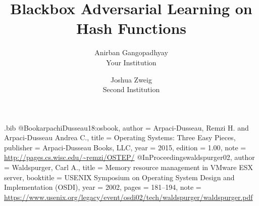 \usepackage{filecontents}
\newtheorem{theorem}{Theorem}

\begin{filecontents}{\jobname.bib}
@Book{arpachiDusseau18:osbook,
  author =       {Arpaci-Dusseau, Remzi H. and Arpaci-Dusseau Andrea C.},
  title =        {Operating Systems: Three Easy Pieces},
  publisher =    {Arpaci-Dusseau Books, LLC},
  year =         2015,
  edition =      {1.00},
  note =         {\url{http://pages.cs.wisc.edu/~remzi/OSTEP/}}
}
@InProceedings{waldspurger02,
  author =       {Waldspurger, Carl A.},
  title =        {Memory resource management in {VMware ESX} server},
  booktitle =    {USENIX Symposium on Operating System Design and
                  Implementation (OSDI)},
  year =         2002,
  pages =        {181--194},
  note =         {\url{https://www.usenix.org/legacy/event/osdi02/tech/waldspurger/waldspurger.pdf}}}
\end{filecontents}



\date{}

\title{\Large \bf Blackbox Adversarial Learning on Hash Functions}

\author{
{\rm Anirban Gangopadhyay}\\
Your Institution
\and
{\rm Joshua Zweig}\\
Second Institution
} %

\maketitle

